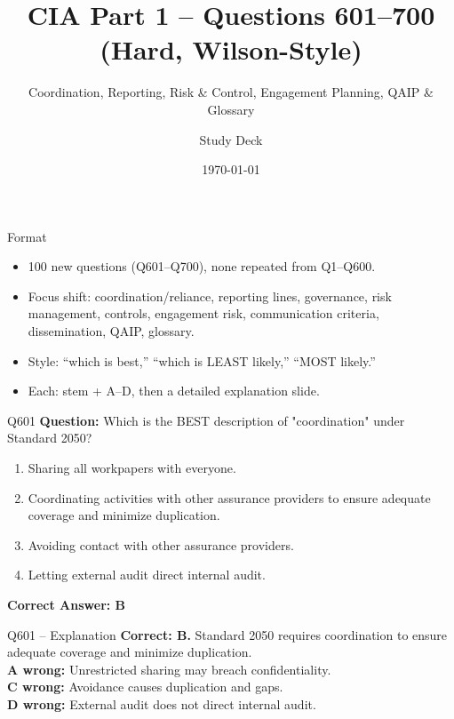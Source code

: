 \documentclass[aspectratio=169,10pt]{beamer}
\title{CIA Part 1 -- Questions 601--700 (Hard, Wilson-Style)}
\subtitle{Coordination, Reporting, Risk \& Control, Engagement Planning, QAIP \& Glossary}
\author{Study Deck}
\date{\today}
\begin{document}
	
	\begin{frame}
		\titlepage
	\end{frame}
	
	\begin{frame}{Format}
		\begin{itemize}
			\item 100 new questions (Q601--Q700), none repeated from Q1--Q600.
			\item Focus shift: coordination/reliance, reporting lines, governance, risk management, controls, engagement risk, communication criteria, dissemination, QAIP, glossary.
			\item Style: ``which is best,'' ``which is LEAST likely,'' ``MOST likely.''
			\item Each: stem + A--D, then a detailed explanation slide.
		\end{itemize}
	\end{frame}
	
	\begin{frame}[t]{Q601}
		\small
		\textbf{Question:} Which is the BEST description of "coordination" under Standard 2050?
		\begin{enumerate}[label=\Alph*.,itemsep=1pt,topsep=2pt]
			\item Sharing all workpapers with everyone.
			\item Coordinating activities with other assurance providers to ensure adequate coverage and minimize duplication.
			\item Avoiding contact with other assurance providers.
			\item Letting external audit direct internal audit.
		\end{enumerate}
		\vspace{4pt}
		\textbf{Correct Answer: B}
	\end{frame}
	
	\begin{frame}[t]{Q601 -- Explanation}
		\small
		\textbf{Correct: B.} Standard 2050 requires coordination to ensure adequate coverage and minimize duplication. \\[4pt]
		\textbf{A wrong:} Unrestricted sharing may breach confidentiality. \\[2pt]
		\textbf{C wrong:} Avoidance causes duplication and gaps. \\[2pt]
		\textbf{D wrong:} External audit does not direct internal audit.
	\end{frame}
	
\end{document}
